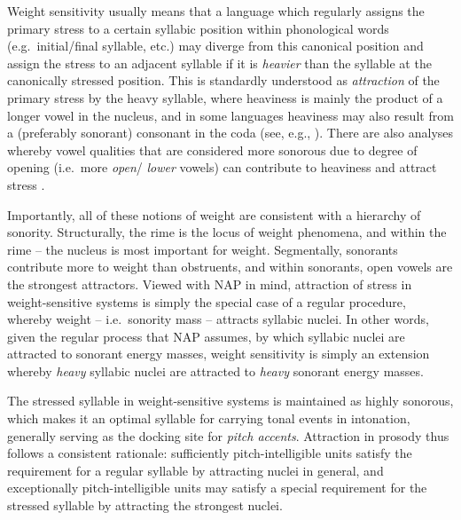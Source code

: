 \begin{sloppypar}
Weight sensitivity usually means that a language which regularly assigns the primary stress to a certain syllabic position within phonological words (e.g.~initial/final syllable, etc.) may diverge from this canonical position and assign the stress to an adjacent syllable if it is \emph{heavier} than the syllable at the canonically stressed position.
This is standardly understood as \emph{attraction} of the primary stress by the heavy syllable, where heaviness is mainly the product of a longer vowel in the nucleus, and in some languages heaviness may also result from a (preferably sonorant) consonant in the coda (see, e.g., \citealt{mccarthy1979formalsk, gordon2006syllableweight, hayes1980metrical, prince1990quantitative}). There are also analyses whereby vowel qualities that are considered more sonorous due to degree of opening (i.e.~more \emph{open}/ \emph{lower} vowels)
can contribute to heaviness and attract stress \citep{gordon2012sonority, kenstowicz1997quality, delacy2002formal, zec1995sonority, zec2003prosodic}.
\end{sloppypar}

Importantly, all of these notions of weight are consistent with a hierarchy of sonority.
Structurally, the rime is the locus of weight phenomena, and within the rime -- the nucleus is most important for weight. Segmentally, sonorants contribute more to weight than obstruents, and within sonorants, open vowels are the strongest attractors.
Viewed with NAP in mind, attraction of stress in weight-sensitive systems is simply the special case of a regular procedure, whereby weight -- i.e.~sonority mass -- attracts syllabic nuclei. In other words, given the regular process that NAP assumes, by which syllabic nuclei are attracted to sonorant energy masses, weight sensitivity is simply an extension whereby \emph{heavy} syllabic nuclei are attracted to \emph{heavy} sonorant energy masses.

The stressed syllable in weight-sensitive systems is maintained as highly sonorous, which makes it an optimal syllable for carrying tonal events in intonation, generally serving as the docking site for \emph{pitch accents}.
Attraction in prosody thus follows a consistent rationale: sufficiently pitch-intelligible units satisfy the requirement for a regular syllable by attracting nuclei in general, and exceptionally pitch-intelligible units may satisfy a special requirement for the stressed syllable by attracting the strongest nuclei.

